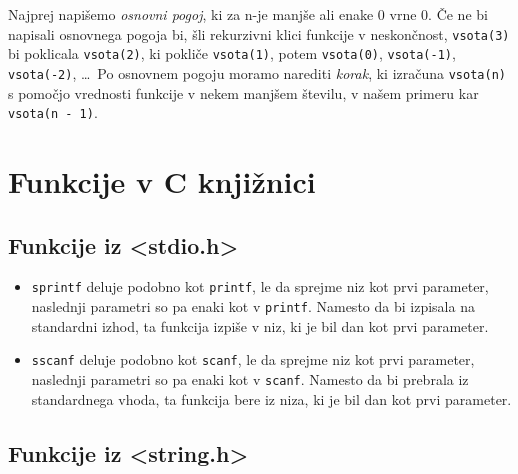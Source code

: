 \begin{examples}
\end{examples}

Najprej napišemo \emph{osnovni pogoj}, ki za n-je manjše ali enake 0 vrne 0. Če
ne bi napisali osnovnega pogoja bi, šli rekurzivni klici funkcije v neskončnost,
\verb+vsota(3)+ bi poklicala \verb+vsota(2)+, ki pokliče \verb+vsota(1)+, potem
\verb+vsota(0)+, \verb+vsota(-1)+, \verb+vsota(-2)+, \ldots \ Po osnovnem
pogoju moramo narediti \emph{korak}, ki izračuna \verb+vsota(n)+ s pomočjo
vrednosti funkcije v nekem manjšem številu, v našem primeru kar
\verb+vsota(n - 1)+.


\section{Funkcije v C knjižnici}

\subsection{Funkcije iz <stdio.h>}

\begin{itemize}
    \item \verb+sprintf+ deluje podobno kot \verb+printf+, le da sprejme niz
        kot prvi parameter, naslednji parametri so pa enaki kot v
        \verb+printf+. Namesto da bi izpisala na standardni izhod, ta funkcija
        izpiše v niz, ki je bil dan kot prvi parameter.
    \item \verb+sscanf+ deluje podobno kot \verb+scanf+, le da sprejme niz kot
        prvi parameter, naslednji parametri so pa enaki kot v \verb+scanf+.
        Namesto da bi prebrala iz standardnega vhoda, ta funkcija bere iz niza,
        ki je bil dan kot prvi parameter.
\end{itemize}

\begin{examples}
\end{examples}

\subsection{Funkcije iz <string.h>}

